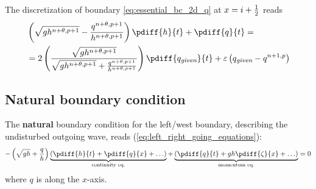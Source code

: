 The discretization of  boundary \autoref{eq:essential_bc_2d_q} at $x=i+\frac{1}{2}$ reads
\begin{align}
    &\left(\sqrt{gh^{n+\theta,p+1}} - \frac{q^{n+\theta,p+1}}{h^{n+\theta,p+1}} \right) \pdiff{h}{t} + \pdiff{q}{t} =
    \nonumber \\*
    & = 2 \left(  \frac{\sqrt{gh^{n+\theta,p+1}}}{\sqrt{gh^{n+\theta,p+1}} + \frac{q^{n+\theta,p+1}}{h^{n+\theta,p+1}}} \right) \pdiff{q_{\textit{given}}}{t} + \eps \left( q_{\textit{given}} - q^{n+1,p}   \right)
\end{align}



\subsection{Natural boundary condition}

The \textbf{natural} boundary condition for the left/west boundary, describing the undisturbed outgoing wave, reads (\autoref{eq:left_right_going_equations}):
\begin{align}
    - \left(\sqrt{gh} + \frac{q}{h}\right) \underbrace{ \left(\pdiff{h}{t} + \pdiff{q}{x} + \ldots \right) }_{\text{continuity eq.}} + \underbrace{\left(\pdiff{q}{t} + g h \pdiff{\zeta}{x}+\ldots\right)}_{\text{momentum eq.}} = 0
\end{align}
where $q$ is along the $x$-axis.




